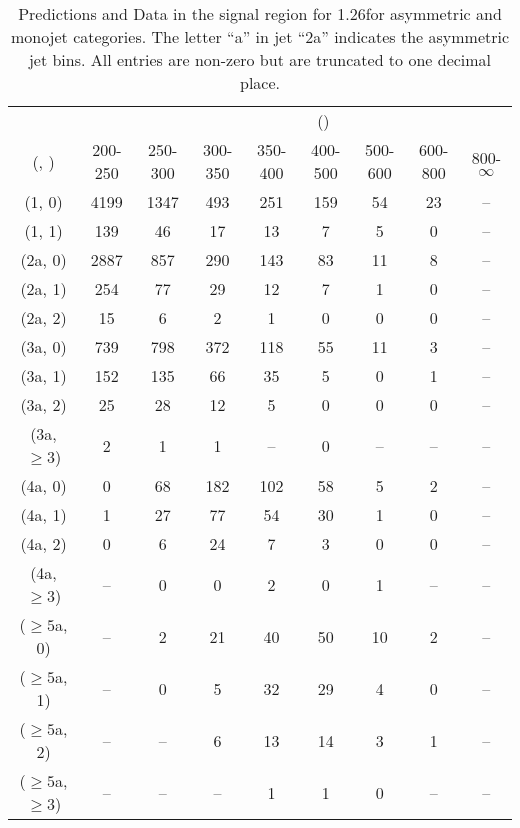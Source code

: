\begin{table}[h!]
\tiny
\centering
\caption{Predictions and Data in the signal region for 1.26\ifb for asymmetric and monojet categories. The letter ``a'' in jet \eg ``2a''  indicates the asymmetric jet bins. All entries are non-zero but are truncated to one decimal place.\label{tab:yieldsseppost_sig_data_asym}}
\begin{tabular}
{ccccccccc}
	\hline\hline
&	& \multicolumn{8}{c}{\scalht (\gev)} \\ 
	 (\njet,  \nb) & 200-250 & 250-300 & 300-350 & 350-400 & 400-500 & 500-600 & 600-800 & 800-$\infty$ \\ [0.8ex] 
\hline
	(1, 0) & 4199 & 1347 & 493 & 251 & 159 & 54 & 23 & -- \\[0.5ex] 
	(1, 1) & 139 & 46 & 17 & 13 & 7 & 5 & 0 & -- \\[0.5ex] 
	(2a, 0) & 2887 & 857 & 290 & 143 & 83 & 11 & 8 & -- \\[0.5ex] 
	(2a, 1) & 254 & 77 & 29 & 12 & 7 & 1 & 0 & -- \\[0.5ex] 
	(2a, 2) & 15 & 6 & 2 & 1 & 0 & 0 & 0 & -- \\[0.5ex] 
	(3a, 0) & 739 & 798 & 372 & 118 & 55 & 11 & 3 & -- \\[0.5ex] 
	(3a, 1) & 152 & 135 & 66 & 35 & 5 & 0 & 1 & -- \\[0.5ex] 
	(3a, 2) & 25 & 28 & 12 & 5 & 0 & 0 & 0 & -- \\[0.5ex] 
	(3a, $\ge3$) & 2 & 1 & 1 & -- & 0 & -- & -- & -- \\[0.5ex] 
	(4a, 0) & 0 & 68 & 182 & 102 & 58 & 5 & 2 & -- \\[0.5ex] 
	(4a, 1) & 1 & 27 & 77 & 54 & 30 & 1 & 0 & -- \\[0.5ex] 
	(4a, 2) & 0 & 6 & 24 & 7 & 3 & 0 & 0 & -- \\[0.5ex] 
	(4a, $\ge3$) & -- & 0 & 0 & 2 & 0 & 1 & -- & -- \\[0.5ex] 
	($\ge5$a, 0) & -- & 2 & 21 & 40 & 50 & 10 & 2 & -- \\[0.5ex] 
	($\ge5$a, 1) & -- & 0 & 5 & 32 & 29 & 4 & 0 & -- \\[0.5ex] 
	($\ge5$a, 2) & -- & -- & 6 & 13 & 14 & 3 & 1 & -- \\[0.5ex] 
	($\ge5$a, $\ge3$) & -- & -- & -- & 1 & 1 & 0 & -- & -- \\[0.5ex] 
	\hline
	\hline
\end{tabular}
\end{table}
